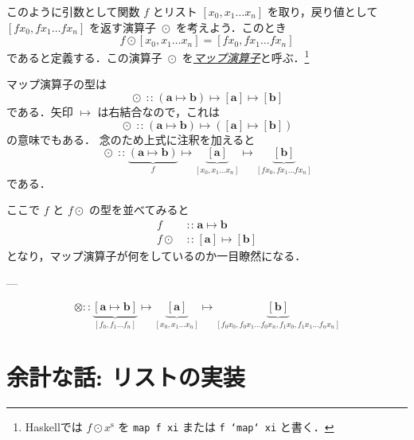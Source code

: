 \documentclass[a4paper,draft]{jsbook}
\newcommand{\programminglanguage}[1]{\textsf{#1}}
\newcommand{\haskell}{\programminglanguage{Haskell}}
\newcommand{\keyword}[1]{{\underline{\emph{#1}}}}
\newcommand{\code}[1]{\texttt{#1}}
\newcommand{\mType}[1]{\mathbf{#1}}
\newcommand{\mListType}[1]{[\mType{#1}]}
\newcommand{\mListOf}[1]{\left[#1\right]}
\newcommand{\mListVar}[1]{{#1}^\mathrm{s}}
\DeclareMathOperator{\mIn}{{:\!:}}
\DeclareMathOperator{\mMapsTo}{\mapsto}
\DeclareMathOperator{\mMapList}{\odot}
\newcommand{\mProjection}[2]{#1\mMapsTo#2}
\newcommand{\mathTypeParameter}[1]{\mathbf{#1}}
\newcommand{\mathListWith}[1]{\left[#1\right]}
\newcommand{\mathApplicativeMap}{\mathbin{\otimes}}
\newcommand{\mathIn}{\mathrel{::}}
\begin{document}
このように引数として関数 $f$ とリスト $\mListOf{x_0,x_1\dots x_n}$ を取り，戻り値として $\mListOf{fx_0,fx_1\dots fx_n}$ を返す演算子 $\mMapList$ を考えよう．このとき
\begin{equation}
f\mMapList\mListOf{x_0,x_1\dots x_n}
=\mListOf{fx_0,fx_1\dots fx_n}
\end{equation}
であると定義する．この演算子 $\mMapList$ を\keyword{マップ演算子}と呼ぶ．\footnote{\haskell では $f\mMapList\mListVar{x}$ を \code{map f xi} または \code{f `map` xi} と書く．}

マップ演算子の型は
\begin{equation}
\mMapList
\mIn{}
\mProjection{(\mProjection{\mType{a}}{\mType{b}})}
{\mProjection{\mListType{a}}{\mListType{b}}}
\end{equation}
である．矢印 $\mMapsTo$ は右結合なので，これは
\begin{equation}
\mMapList
\mIn{}
\mProjection{(\mProjection{\mType{a}}{\mType{b}})}
{(\mProjection{\mListType{a}}{\mListType{b}})}
\end{equation}
の意味でもある．
念のため上式に注釈を加えると
\begin{equation}
\mMapList\mIn
\underbrace{\left(\mType{a}\mMapsTo\mType{b}\right)}_f
\mMapsTo
\underbrace{\mListType{a}}_{\mListOf{x_0,x_1\dots x_n}}
\mMapsTo
\underbrace{\mListType{b}}_{\mListOf{fx_0,fx_1\dots fx_n}}
\end{equation}
である．

ここで $f$ と $f\mMapList$ の型を並べてみると
\begin{align}
f&\mIn\mProjection{\mType{a}}{\mType{b}}\\
f\mMapList&\mIn\mProjection{\mListType{a}}{\mListType{b}}
\end{align}
となり，マップ演算子が何をしているのか一目瞭然になる．

---


\begin{equation*}
\mathApplicativeMap\mathIn
\underbrace{\mathListWith{\mathTypeParameter{a}\mMapsTo\mathTypeParameter{b}}}_{\mathListWith{f_0,f_1\dots f_n}}
\mMapsTo
\underbrace{\mListType{a}}_{\mathListWith{x_0,x_1\dots x_n}}
\mMapsTo
\underbrace{\mListType{\mathTypeParameter{b}}}_{\mathListWith{f_0x_0,f_0x_1\dots f_0x_n,f_1x_0,f_1x_1\dots f_nx_n}}
\end{equation*}


\section{余計な話: リストの実装}
\end{document}
